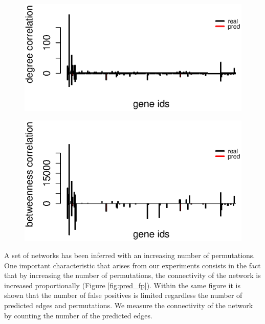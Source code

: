 \begin{figure} 
\noindent\begin{minipage}{.5\textwidth}
\centering
  \includegraphics[width=1\linewidth]{degree_barplot.eps}
  \label{fig:degree}
\end{minipage}
\noindent\begin{minipage}{.5\textwidth}
  \includegraphics[width=1\linewidth]{between_barplot.eps}
  \label{fig:between}
\end{minipage}
\end{figure}


A set of networks has been inferred with an increasing number of permutations. One important characteristic that arises from our experiments consists in the fact that by increasing the number of permutations, the connectivity of the network is increased proportionally (Figure \ref{fig:pred_fp}). Within the same figure it is shown that the number of false positives is limited regardless the number of predicted edges and permutations.   
We measure the connectivity of the network by counting the number of the predicted edges. 

